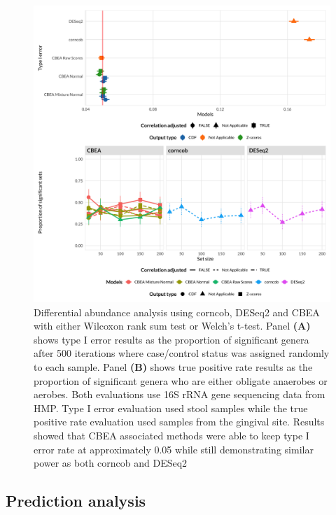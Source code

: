 \begin{figure}[!h]
    \centering
    \includegraphics[width = \textwidth]{figures/data_diff_ab.png}
    \caption{Differential abundance analysis using corncob, DESeq2 and CBEA with either Wilcoxon rank sum test or Welch's t-test. Panel \textbf{(A)} shows type I error results as the proportion of significant genera after 500 iterations where case/control status was assigned randomly to each sample. Panel \textbf{(B)} shows true positive rate results as the proportion of significant genera who are either obligate anaerobes or aerobes. Both evaluations use 16S rRNA gene sequencing data from HMP. Type I error evaluation used stool samples while the true positive rate evaluation used samples from the gingival site. Results showed that CBEA associated methods were able to keep type I error rate at approximately 0.05 while still demonstrating similar power as both corncob and DESeq2} 
    \label{fig:5}
\end{figure}

\subsection{Prediction analysis}
